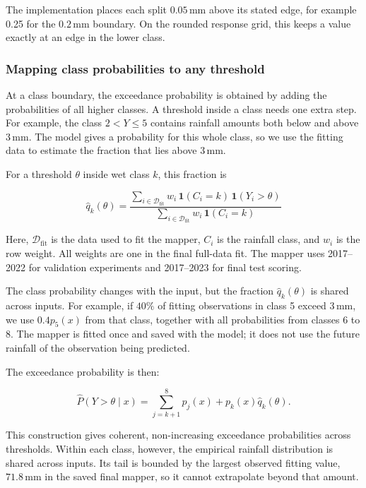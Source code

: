 \documentclass[11pt,a4paper]{article}
\begin{document}
The implementation places each split \(0.05\,\mathrm{mm}\) above its stated edge, for example 0.25 for the \(0.2\,\mathrm{mm}\) boundary. On the rounded response grid, this keeps a value exactly at an edge in the lower class. 


\subsubsection*{Mapping class probabilities to any threshold}
{}


At a class boundary, the exceedance probability is obtained by adding the probabilities of all higher classes. A threshold inside a class needs one extra step. For example, the class \(2<Y\leq 5\) contains rainfall amounts both below and above \(3\,\mathrm{mm}\). The model gives a probability for this whole class, so we use the fitting data to estimate the fraction that lies above \(3\,\mathrm{mm}\). 


For a threshold \(\theta\) inside wet class \(k\), this fraction is


\[
\widehat q_k(\theta)=\frac{\sum_{i\in\mathcal D_{\mathrm{fit}}} w_i\,\mathbf{1}(C_i=k)\,\mathbf{1}(Y_i>\theta)}{\sum_{i\in\mathcal D_{\mathrm{fit}}} w_i\,\mathbf{1}(C_i=k)}
\]


Here, \(\mathcal D_{\mathrm{fit}}\) is the data used to fit the mapper, \(C_i\) is the rainfall class, and \(w_i\) is the row weight. All weights are one in the final full-data fit. The mapper uses 2017–2022 for validation experiments and 2017–2023 for final test scoring.


The class probability changes with the input, but the fraction \(\widehat q_k(\theta)\) is shared across inputs. For example, if \(40\%\) of fitting observations in class 5 exceed \(3\,\mathrm{mm}\), we use \(0.4p_5(x)\) from that class, together with all probabilities from classes 6 to 8. The mapper is fitted once and saved with the model; it does not use the future rainfall of the observation being predicted.


The exceedance probability is then:


\[
\widehat P(Y>\theta\mid x)=\sum_{j=k+1}^{8}p_j(x)+p_k(x)\widehat q_k(\theta).
\]


This construction gives coherent, non-increasing exceedance probabilities across thresholds. Within each class, however, the empirical rainfall distribution is shared across inputs. Its tail is bounded by the largest observed fitting value, \(71.8\,\mathrm{mm}\) in the saved final mapper, so it cannot extrapolate beyond that amount. 
\end{document}
